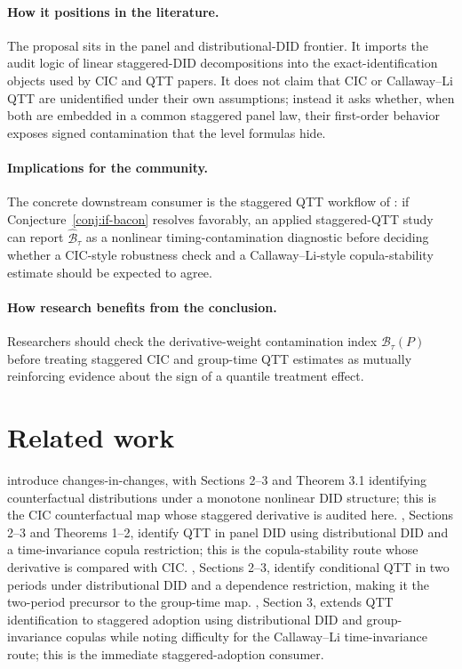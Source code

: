 \documentclass[11pt]{article}
\theoremstyle{definition}
\theoremstyle{plain}
\theoremstyle{remark}
\begin{document}
\paragraph{How it positions in the literature.}
The proposal sits in the panel and distributional-DID frontier.  It imports the audit logic of linear staggered-DID decompositions into the exact-identification objects used by CIC and QTT papers.  It does not claim that CIC or Callaway--Li QTT are unidentified under their own assumptions; instead it asks whether, when both are embedded in a common staggered panel law, their first-order behavior exposes signed contamination that the level formulas hide.

\paragraph{Implications for the community.}
The concrete downstream consumer is the staggered QTT workflow of \citet{LiLin2024}: if Conjecture~\ref{conj:if-bacon} resolves favorably, an applied staggered-QTT study can report \(\widehat{\mathcal B}_\tau\) as a nonlinear timing-contamination diagnostic before deciding whether a CIC-style robustness check and a Callaway--Li-style copula-stability estimate should be expected to agree.

\paragraph{How research benefits from the conclusion.}
Researchers should check the derivative-weight contamination index \(\mathcal B_\tau(P)\) before treating staggered CIC and group-time QTT estimates as mutually reinforcing evidence about the sign of a quantile treatment effect.

\section{Related work}
\citet{AtheyImbens2006} introduce changes-in-changes, with Sections 2--3 and Theorem 3.1 identifying counterfactual distributions under a monotone nonlinear DID structure; this is the CIC counterfactual map whose staggered derivative is audited here.  \citet{CallawayLi2019}, Sections 2--3 and Theorems 1--2, identify QTT in panel DID using distributional DID and a time-invariance copula restriction; this is the copula-stability route whose derivative is compared with CIC.  \citet{CallawayLiOka2018}, Sections 2--3, identify conditional QTT in two periods under distributional DID and a dependence restriction, making it the two-period precursor to the group-time map.  \citet{LiLin2024}, Section 3, extends QTT identification to staggered adoption using distributional DID and group-invariance copulas while noting difficulty for the Callaway--Li time-invariance route; this is the immediate staggered-adoption consumer.
\end{document}
